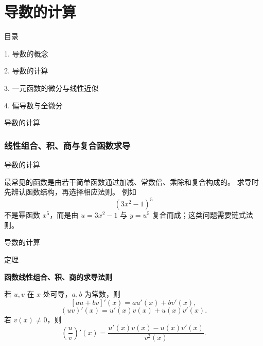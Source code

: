 \documentclass[aspectratio=169,10pt,fontset=fandol]{ctexbeamer}
\begin{document}
\section{导数的计算}
\begin{frame}[t,fragile]{目录}
\normalsize
{\color{black}\normalsize 1. 导数的概念\par}\vspace{0.22em}
{\color{blue}\normalsize 2. 导数的计算\par}\vspace{0.22em}
{\color{gray!40}\normalsize 3. 一元函数的微分与线性近似\par}\vspace{0.22em}
{\color{gray!40}\normalsize 4. 偏导数与全微分\par}\vspace{0.22em}
\end{frame}
\begin{frame}[t,fragile]{导数的计算}
\footnotesize
{\footnotesize

\subsubsection*{线性组合、积、商与复合函数求导}


}
\end{frame}
\begin{frame}[t,fragile]{导数的计算}
\footnotesize
{\footnotesize
最常见的函数是由若干简单函数通过加减、常数倍、乘除和复合构成的。 求导时先辨认函数结构，再选择相应法则。 例如
\[
(3x^2-1)^5
\]
不是幂函数 $x^5$，而是由 $u=3x^2-1$ 与 $y=u^5$ 复合而成；这类问题需要链式法则。


}
\end{frame}
\begin{frame}[t,fragile]{导数的计算}
\footnotesize
\begin{block}{定理}
{\footnotesize
\textbf{函数线性组合、积、商的求导法则}\par

若 $u,v$ 在 $x$ 处可导，$a,b$ 为常数，则
\[
[au+bv]'(x)=au'(x)+bv'(x),
\]
\[
(uv)'(x)=u'(x)v(x)+u(x)v'(x).
\]
若 $v(x)\neq0$，则
\[
\left(\frac{u}{v}\right)'(x)=\frac{u'(x)v(x)-u(x)v'(x)}{v^2(x)}.
\]

}
\end{block}
\end{frame}
\end{document}
